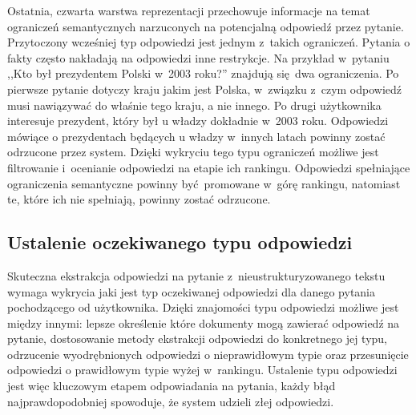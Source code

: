\documentclass[a4paper, twoside, openright, 12pt]{report}
\begin{document}
            Ostatnia, czwarta warstwa reprezentacji przechowuje informacje na temat ograniczeń semantycznych narzuconych
            na potencjalną odpowiedź przez pytanie. Przytoczony wcześniej typ odpowiedzi jest jednym z~takich ograniczeń.
            Pytania o fakty często nakładają na odpowiedzi inne restrykcje. Na przykład w~pytaniu ,,Kto był prezydentem
            Polski w~2003 roku?'' znajdują się dwa ograniczenia. Po pierwsze pytanie dotyczy kraju jakim jest Polska,
            w~związku z~czym odpowiedź musi nawiązywać do właśnie tego kraju, a nie innego. Po drugi użytkownika
            interesuje prezydent, który był u władzy dokładnie w~2003 roku. Odpowiedzi mówiące o prezydentach będących
            u władzy w~innych latach powinny zostać odrzucone przez system. Dzięki wykryciu tego typu ograniczeń
            możliwe jest filtrowanie i~ocenianie odpowiedzi na etapie ich rankingu. Odpowiedzi spełniające ograniczenia
            semantyczne powinny być promowane w~górę rankingu, natomiast te, które ich nie spełniają, powinny zostać
            odrzucone.

        \subsection{Ustalenie oczekiwanego typu odpowiedzi}
            Skuteczna ekstrakcja odpowiedzi na pytanie z~nieustrukturyzowanego tekstu wymaga wykrycia jaki jest typ
            oczekiwanej odpowiedzi dla danego pytania pochodzącego od użytkownika. Dzięki znajomości typu odpowiedzi
            możliwe jest między innymi: lepsze określenie które dokumenty mogą zawierać odpowiedź na pytanie,
            dostosowanie metody ekstrakcji odpowiedzi do konkretnego jej typu, odrzucenie wyodrębnionych odpowiedzi
            o nieprawidłowym typie oraz przesunięcie odpowiedzi o prawidłowym typie wyżej w~rankingu. Ustalenie typu
            odpowiedzi jest więc kluczowym etapem odpowiadania na pytania, każdy błąd najprawdopodobniej spowoduje,
            że system udzieli złej odpowiedzi.
\end{document}
